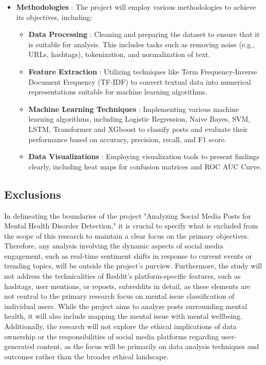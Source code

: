 \begin{itemize}
    \item \textbf{Methodologies} :
    \noindent
    The project will employ various methodologies to achieve its objectives, including:
    \begin{itemize}
        \item \textbf{Data Processing} :
        \noindent
        Cleaning and preparing the dataset to ensure that it is suitable for analysis. This includes tasks such as removing noise (e.g., URLs, hashtags), tokenization, and normalization of text.
        \item \textbf{Feature Extraction} :
        \noindent
        Utilizing techniques like Term Frequency-Inverse Document Frequency (TF-IDF) to convert textual data into numerical representations suitable for machine learning algorithms.
        \item \textbf{Machine Learning Techniques} :
        \noindent
        Implementing various machine learning algorithms, including Logistic Regression, Naive Bayes, SVM, LSTM, Transformer and XGboost to classify posts and evaluate their performance based on accuracy, precision, recall, and F1 score.
        \item \textbf{Data Visualizations} :
        \noindent
        Employing visualization tools to present findings clearly, including heat maps for confusion matrices and ROC AUC Curve.
    \end{itemize}
\end{itemize}

\subsection{Exclusions}
\noindent
In delineating the boundaries of the project "Analyzing Social Media Posts for Mental Health Disorder Detection," it is crucial to specify what is excluded from the scope of this research to maintain a clear focus on the primary objectives. Therefore, any analysis involving the dynamic aspects of social media engagement, such as real-time sentiment shifts in response to current events or trending topics, will be outside the project's purview. Furthermore, the study will not address the technicalities of Reddit’s platform-specific features, such as hashtags, user mentions, or reposts, subreddits in detail, as these elements are not central to the primary research focus on mental issue classification of individual users. While the project aims to analyze posts surrounding mental health, it will also include mapping the mental issue with mental wellbeing. Additionally, the research will not explore the ethical implications of data ownership or the responsibilities of social media platforms regarding user-generated content, as the focus will be primarily on data analysis techniques and outcomes rather than the broader ethical landscape.

